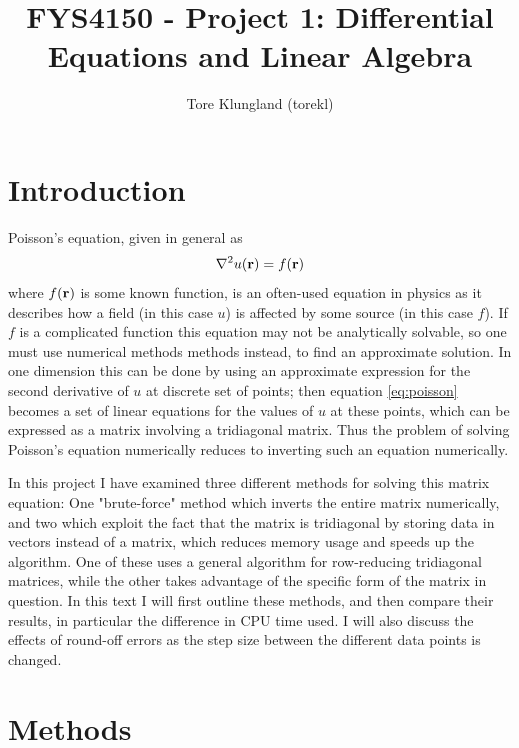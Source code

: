 \documentclass[a4paper,english]{article}
\title{FYS4150 - Project 1: Differential Equations and Linear Algebra}
\author{Tore Klungland (torekl)}
\renewcommand\vec{\mathbf}
\let\originalleft\left
\let\originalright\right
\renewcommand{\left}{\mathopen{}\mathclose\bgroup\originalleft}
\renewcommand{\right}{\aftergroup\egroup\originalright}
\begin{document}
\maketitle
\section{Introduction}
Poisson's equation, given in general as
\begin{equation}
  \nabla^2 u\left(\vec{r}\right) = f\left(\vec{r}\right)
  \label{eq:poisson}
\end{equation}
where $f\left(\vec{r}\right)$ is some known function, is an often-used equation in physics as it describes how a field (in this case $u$) is affected by some source (in this case $f$). If $f$ is a complicated function this equation may not be analytically solvable, so one must use numerical methods methods instead, to find an approximate solution. In one dimension this can be done by using an approximate expression for the second derivative of $u$ at discrete set of points; then equation \ref{eq:poisson} becomes a set of linear equations for the values of $u$ at these points, which can be expressed as a matrix involving a tridiagonal matrix. Thus the problem of solving Poisson's equation numerically reduces to inverting such an equation numerically. \par
In this project I have examined three different methods for solving this matrix equation: One "brute-force" method which inverts the entire matrix numerically, and two which exploit the fact that the matrix is tridiagonal by storing data in vectors instead of a matrix, which reduces memory usage and speeds up the algorithm. One of these uses a general algorithm for row-reducing tridiagonal matrices, while the other takes advantage of the specific form of the matrix in question. In this text I will first outline these methods, and then compare their results, in particular the difference in CPU time used. I will also discuss the effects of round-off errors as the step size between the different data points is changed.
\section{Methods}
\end{document}
